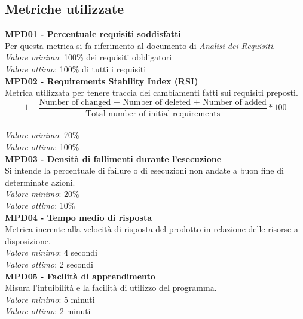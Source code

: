 \subsection{Metriche utilizzate}

\noindent\textbf{MPD01 - Percentuale requisiti soddisfatti}\\
Per questa metrica si fa riferimento al documento di \textit{Analisi dei Requisiti}.\\
\textit{Valore minimo}: 100\% dei requisiti obbligatori\\
\textit{Valore ottimo}: 100\% di tutti i requisiti\\

\noindent\textbf{MPD02 - Requirements Stability Index (RSI)}\\
Metrica utilizzata per tenere traccia dei cambiamenti fatti sui requisiti preposti.\\
\begin{equation}
1-\frac{\text{Number of changed + Number of deleted + Number of added}}{\text{Total number of initial requirements}}*100
\end{equation}\\
\textit{Valore minimo}: 70\%\\
\textit{Valore ottimo}: 100\%\\

\noindent\textbf{MPD03 - Densità di fallimenti durante l'esecuzione}\\
Si intende la percentuale di failure o di esecuzioni non andate a buon fine di determinate azioni.\\
\textit{Valore minimo}: 20\%\\
\textit{Valore ottimo}: 10\%\\

\noindent\textbf{MPD04 - Tempo medio di risposta}\\
Metrica inerente alla velocità di risposta del prodotto in relazione delle risorse a disposizione.\\
\textit{Valore minimo}: 4 secondi\\
\textit{Valore ottimo}: 2 secondi\\

\noindent\textbf{MPD05 - Facilità di apprendimento}\\
Misura l'intuibilità e la facilità di utilizzo del programma.\\
\textit{Valore minimo}: 5 minuti\\
\textit{Valore ottimo}: 2 minuti\\

